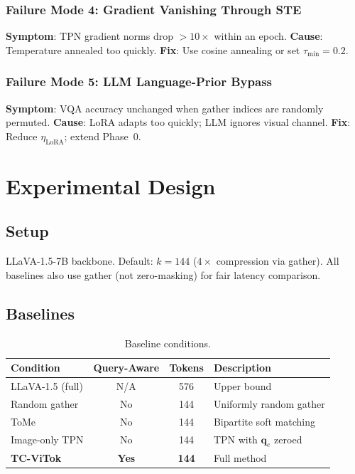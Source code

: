 \documentclass[11pt,a4paper]{article}
\newcommand{\qe}{\mathbf{q}_e}
\begin{document}
\subsubsection{Failure Mode 4: Gradient Vanishing Through STE}
\begin{warnbox}[title={Gradient Vanishing}]
\textbf{Symptom}: TPN gradient norms drop ${>}10\times$ within an epoch.
\textbf{Cause}: Temperature annealed too quickly.
\textbf{Fix}: Use cosine annealing or set $\tau_{\min}{=}0.2$.
\end{warnbox}

\subsubsection{Failure Mode 5: LLM Language-Prior Bypass}
\begin{warnbox}[title={LLM Bypass}]
\textbf{Symptom}: VQA accuracy unchanged when gather indices are randomly
permuted.
\textbf{Cause}: LoRA adapts too quickly; LLM ignores visual channel.
\textbf{Fix}: Reduce $\eta_{\text{LoRA}}$; extend Phase~0.
\end{warnbox}

\section{Experimental Design}
\label{sec:experiments}

\subsection{Setup}

LLaVA-1.5-7B backbone. Default: $k{=}144$ ($4\times$ compression via gather).
All baselines also use gather (not zero-masking) for fair latency comparison.

\subsection{Baselines}

\begin{table}[h]
\centering
\caption{Baseline conditions.}
\label{tab:baselines}
\renewcommand{\arraystretch}{1.15}
\small
\begin{tabular}{@{}lccp{5cm}@{}}
  \toprule
  Condition & Query-Aware & Tokens & Description \\
  \midrule
  LLaVA-1.5 (full) & N/A & 576 & Upper bound \\
  Random gather     & No  & 144 & Uniformly random gather \\
  ToMe              & No  & 144 & Bipartite soft matching \\
  Image-only TPN    & No  & 144 & TPN with $\qe$ zeroed \\
  \textbf{TC-ViTok} & \textbf{Yes} & \textbf{144} & Full method \\
  \bottomrule
\end{tabular}
\end{table}
\end{document}

